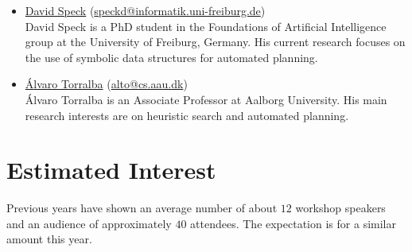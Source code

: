 \documentclass[10pt]{article}
\begin{document}
\begin{itemize}
\item \href{http://www.informatik.uni-freiburg.de/~speckd/}{David Speck}
(\href{mailto:speckd@informatik.uni-freiburg.de}{speckd@informatik.uni-freiburg.de})\\
David Speck is a PhD student in the Foundations of Artificial Intelligence
group at the University of Freiburg, Germany. His current research focuses on
the use of symbolic data structures for automated planning.

\item \href{https://people.cs.aau.dk/~alto/}{{\'A}lvaro Torralba}
  (\href{mailto:alto@cs.aau.dk}{alto@cs.aau.dk})\\ \'Alvaro Torralba is an Associate
  Professor at Aalborg University. His main research interests are on heuristic search and
  automated planning.


\end{itemize}

\section*{Estimated Interest}
Previous years have shown an average number of about $12$ workshop
speakers and an audience of approximately $40$ attendees. The
expectation is for a similar amount this year.
\end{document}
